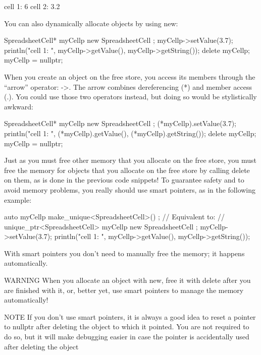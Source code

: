 \begin{shell}
cell 1: 6
cell 2: 3.2
\end{shell}



You can also dynamically allocate objects by using new:


\begin{cpp}
SpreadsheetCell* myCellp { new SpreadsheetCell { } };
myCellp->setValue(3.7);
println("cell 1: {} {}", myCellp->getValue(), myCellp->getString());
delete myCellp;
myCellp = nullptr;
\end{cpp}

When you create an object on the free store, you access its members through the “arrow” operator: ->. The arrow combines dereferencing (*) and member access (.). You could use those two operators instead, but doing so would be stylistically awkward:

\begin{cpp}
SpreadsheetCell* myCellp { new SpreadsheetCell { } };
(*myCellp).setValue(3.7);
println("cell 1: {} {}", (*myCellp).getValue(), (*myCellp).getString());
delete myCellp;
myCellp = nullptr;
\end{cpp}

Just as you must free other memory that you allocate on the free store, you must free the memory for objects that you allocate on the free store by calling delete on them, as is done in the previous code snippets! To guarantee safety and to avoid memory problems, you really should use smart pointers, as in the following example:

\begin{cpp}
auto myCellp { make_unique<SpreadsheetCell>() };
// Equivalent to:
// unique_ptr<SpreadsheetCell> myCellp { new SpreadsheetCell { } };
myCellp->setValue(3.7);
println("cell 1: {} {}", myCellp->getValue(), myCellp->getString());
\end{cpp}

With smart pointers you don’t need to manually free the memory; it happens automatically.

\begin{myWarning}{WARNING}
When you allocate an object with new, free it with delete after you are finished with it, or, better yet, use smart pointers to manage the memory automatically!
\end{myWarning}

\begin{myNotic}{NOTE}
If you don’t use smart pointers, it is always a good idea to reset a pointer to nullptr after deleting the object to which it pointed. You are not required to do so, but it will make debugging easier in case the pointer is accidentally used after deleting the object
\end{myNotic}


